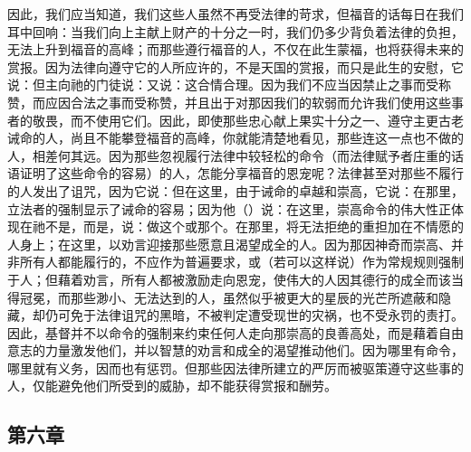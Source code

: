 因此，我们应当知道，我们这些人虽然不再受法律的苛求，但福音的话每日在我们耳中回响：当我们向上主献上财产的十分之一时，我们仍多少背负着法律的负担，无法上升到福音的高峰；而那些遵行福音的人，不仅在此生蒙福，也将获得未来的赏报。因为法律向遵守它的人所应许的，不是天国的赏报，而只是此生的安慰，它说：但主向祂的门徒说：又说：这合情合理。因为我们不应当因禁止之事而受称赞，而应因合法之事而受称赞，并且出于对那因我们的软弱而允许我们使用这些事者的敬畏，而不使用它们。因此，即使那些忠心献上果实十分之一、遵守主更古老诫命的人，尚且不能攀登福音的高峰，你就能清楚地看见，那些连这一点也不做的人，相差何其远。因为那些忽视履行法律中较轻松的命令（而法律赋予者庄重的话语证明了这些命令的容易）的人，怎能分享福音的恩宠呢？法律甚至对那些不履行的人发出了诅咒，因为它说：但在这里，由于诫命的卓越和崇高，它说：在那里，立法者的强制显示了诫命的容易；因为他（）说：在这里，崇高命令的伟大性正体现在祂不是，而是，说：做这个或那个。在那里，将无法拒绝的重担加在不情愿的人身上；在这里，以劝言迎接那些愿意且渴望成全的人。因为那因神奇而崇高、并非所有人都能履行的，不应作为普遍要求，或（若可以这样说）作为常规规则强制于人；但藉着劝言，所有人都被激励走向恩宠，使伟大的人因其德行的成全而该当得冠冕，而那些渺小、无法达到的人，虽然似乎被更大的星辰的光芒所遮蔽和隐藏，却仍可免于法律诅咒的黑暗，不被判定遭受现世的灾祸，也不受永罚的责打。因此，基督并不以命令的强制来约束任何人走向那崇高的良善高处，而是藉着自由意志的力量激发他们，并以智慧的劝言和成全的渴望推动他们。因为哪里有命令，哪里就有义务，因而也有惩罚。但那些因法律所建立的严厉而被驱策遵守这些事的人，仅能避免他们所受到的威胁，却不能获得赏报和酬劳。\par


\subsection{第六章}

